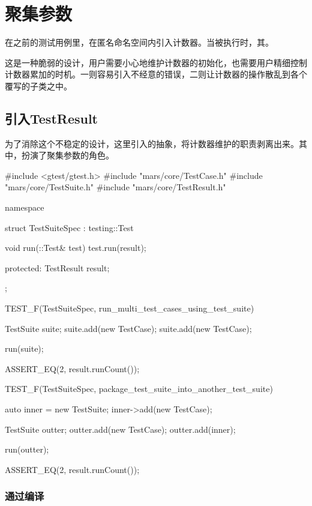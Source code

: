 \section{聚集参数}

\begin{content}

在之前的测试用例里，在匿名命名空间内引入计数器。当被执行时，其。

这是一种脆弱的设计，用户需要小心地维护计数器的初始化，也需要用户精细控制计数器累加的时机。一则容易引入不经意的错误，二则让计数器的操作散乱到各个覆写的子类之中。

\subsection{引入TestResult}

为了消除这个不稳定的设计，这里引入的抽象，将计数器维护的职责剥离出来。其中，扮演了聚集参数的角色。

\begin{leftbar}
 \begin{c++}[caption={\ttfamily{test/mars/core/TestSuiteSpec.cc}}]
#include <gtest/gtest.h>
#include "mars/core/TestCase.h"
#include "mars/core/TestSuite.h"
#include "mars/core/TestResult.h"

namespace {
  struct TestSuiteSpec : testing::Test {
    void run(::Test& test) {
      test.run(result);
    }

  protected:
    TestResult result;
  };
}

TEST_F(TestSuiteSpec, run_multi_test_cases_using_test_suite) {
  TestSuite suite;
  suite.add(new TestCase);
  suite.add(new TestCase);

  run(suite);

  ASSERT_EQ(2, result.runCount());
}

TEST_F(TestSuiteSpec, package_test_suite_into_another_test_suite) {
  auto inner = new TestSuite;
  inner->add(new TestCase);

  TestSuite outter;
  outter.add(new TestCase);
  outter.add(inner);

  run(outter);

  ASSERT_EQ(2, result.runCount());
}
 \end{c++}
\end{leftbar}

\subsubsection{通过编译}


\end{content}
